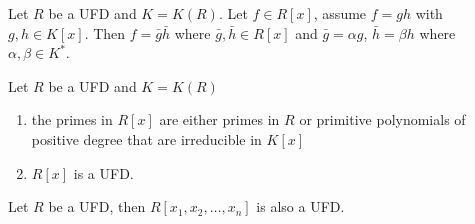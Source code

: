 \begin{corollary}
    Let \(R\) be a UFD and \(K = K(R)\). Let \(f \in R[x]\), assume \(f = gh\) with \(g, h \in K[x]\). Then \(f = \bar{g}\bar{h}\) where \(\bar{g}, \bar{h} \in R[x]\) and \(\bar{g} = \alpha g\), \(\bar{h} = \beta h\) where \(\alpha, \beta \in K^*\).
\end{corollary}

\begin{theorem}
    Let \(R\) be a UFD and \(K = K(R)\)
    \begin{enumerate}
        \item the primes in \(R[x]\) are either primes in \(R\) or primitive polynomials of positive degree that are irreducible in \(K[x]\)
        \item \(R[x]\) is a UFD.
    \end{enumerate}
\end{theorem}

\begin{corollary}
    Let \(R\) be a UFD, then \(R[x_1, x_2, \dots, x_n]\) is also a UFD.
\end{corollary}